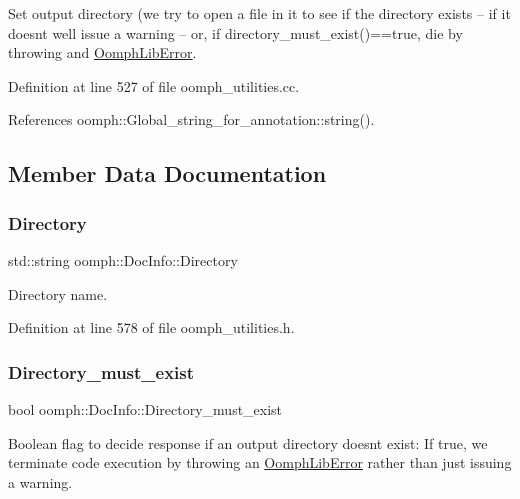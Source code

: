 Set output directory (we try to open a file in it to see if the directory exists -- if it doesn\textquotesingle{}t we\textquotesingle{}ll issue a warning -- or, if directory\+\_\+must\+\_\+exist()==true, die by throwing and \hyperlink{classoomph_1_1OomphLibError}{Oomph\+Lib\+Error}. 

Definition at line 527 of file oomph\+\_\+utilities.\+cc.



References oomph\+::\+Global\+\_\+string\+\_\+for\+\_\+annotation\+::string().



\subsection{Member Data Documentation}
\mbox{\label{classoomph_1_1DocInfo_a9538155b259c6b8f491b1cd49f9f055e}} 
\subsubsection{\texorpdfstring{Directory}{Directory}}
{\footnotesize\ttfamily std\+::string oomph\+::\+Doc\+Info\+::\+Directory\hspace{0.3cm}{\ttfamily [private]}}



Directory name. 



Definition at line 578 of file oomph\+\_\+utilities.\+h.

\mbox{\label{classoomph_1_1DocInfo_a3ff79aa3d627c27a94404607952d768c}} 
\subsubsection{\texorpdfstring{Directory\+\_\+must\+\_\+exist}{Directory\_must\_exist}}
{\footnotesize\ttfamily bool oomph\+::\+Doc\+Info\+::\+Directory\+\_\+must\+\_\+exist\hspace{0.3cm}{\ttfamily [private]}}

Boolean flag to decide response if an output directory doesn\textquotesingle{}t exist\+: If true, we terminate code execution by throwing an \hyperlink{classoomph_1_1OomphLibError}{Oomph\+Lib\+Error} rather than just issuing a warning. 

